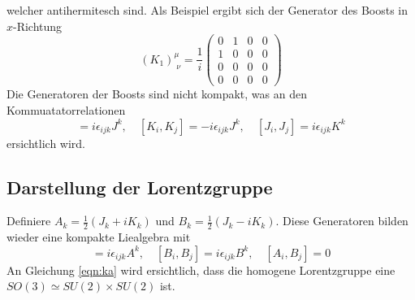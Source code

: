 \documentclass[
  captions=tableheading,  %
  titlepage=firstiscover, %
]{scrartcl}
\begin{document}
welcher antihermitesch sind.
Als Beispiel ergibt sich der Generator des Boosts in $x$-Richtung
\begin{equation*}
  (K_1)_{\; \nu}^{\mu} = \frac{1}{i}
  \begin{pmatrix}
    0&1&0&0\\
    1&0&0&0\\
    0&0&0&0\\
    0&0&0&0
  \end{pmatrix}
\end{equation*}
Die Generatoren der Boosts sind nicht kompakt, was an den Kommuatatorrelationen 
\begin{equation*}
  [J_i,J_j] = i \epsilon_{ijk} J^k,\quad [K_i, K_j] = - i \epsilon_{ijk} J^k, 
  \quad [J_i,J_j] = i \epsilon_{ijk} K^k
\end{equation*}
ersichtlich wird.
\subsection{Darstellung der Lorentzgruppe}
Definiere $A_k = \frac{1}{2} (J_k + i K_k)$ und $B_k = \frac{1}{2} (J_k - i K_k)$.
Diese Generatoren bilden wieder eine kompakte Liealgebra mit 
\begin{equation*}
  [A_i,A_j] = i \epsilon_{ijk} A^k, \quad [B_i,B_j] = i \epsilon_{ijk} B^k, \quad [A_i,B_j] = 0 \label{eqn:ka}
\end{equation*}
An Gleichung \eqref{eqn:ka} wird ersichtlich, dass die homogene Lorentzgruppe eine $SO(3) \simeq SU(2) \times SU(2)$
ist. 
\end{document}
